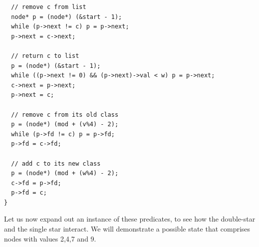 \documentclass[12pt,a4paper]{article}
\begin{document}
\begin{lstlisting}
  // remove c from list 
  node* p = (node*) (&start - 1);
  while (p->next != c) p = p->next;
  p->next = c->next;
  
  // return c to list
  p = (node*) (&start - 1);
  while ((p->next != 0) && (p->next)->val < w) p = p->next;
  c->next = p->next;
  p->next = c;
  
  // remove c from its old class
  p = (node*) (mod + (v%4) - 2);
  while (p->fd != c) p = p->fd;
  p->fd = c->fd;
  
  // add c to its new class
  p = (node*) (mod + (w%4) - 2);
  c->fd = p->fd;
  p->fd = c;
}
\end{lstlisting}

Let us now expand out an instance of these predicates, to see how the double-star and the single star interact. We will demonstrate a possible state that comprises nodes with values 2,4,7 and 9. \footnotesize
\end{document}
